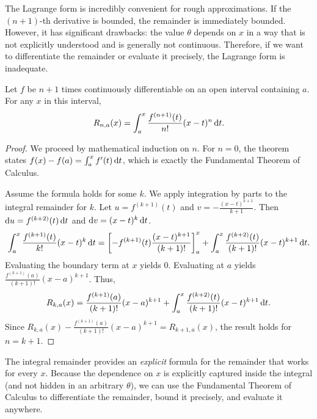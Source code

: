 \documentclass[../analysis1.tex]{subfiles}
\begin{document}
\begin{remark}
    The Lagrange form is incredibly convenient for rough approximations. If the $(n+1)$-th derivative is bounded, the remainder is immediately bounded. However, it has significant drawbacks: the value $\theta$ depends on $x$ in a way that is not explicitly understood and is generally not continuous. Therefore, if we want to differentiate the remainder or evaluate it precisely, the Lagrange form is inadequate.
\end{remark}

\begin{theorem}
\label{thm:tti}
    \begin{shaded*}
        Let $f$ be $n+1$ times continuously differentiable on an open interval containing $a$. For any $x$ in this interval,
        \[
            R_{n,a}(x) = \int_a^x \frac{f^{(n+1)}(t)}{n!} (x-t)^n \d{t}.
        \]
    \end{shaded*}
\end{theorem}

\begin{proof}
    We proceed by mathematical induction on $n$. 
    For $n=0$, the theorem states $f(x) - f(a) = \int_a^x f'(t) \d{t}$, which is exactly the Fundamental Theorem of Calculus.
    
    Assume the formula holds for some $k$. We apply integration by parts to the integral remainder for $k$. Let $u = f^{(k+1)}(t)$ and $v = -\frac{(x-t)^{k+1}}{k+1}$. Then $\d{u} = f^{(k+2)}(t)\d{t}$ and $\d{v} = (x-t)^k\d{t}$.
    \[
        \int_a^x \frac{f^{(k+1)}(t)}{k!} (x-t)^k \d{t} = \left[ -f^{(k+1)}(t) \frac{(x-t)^{k+1}}{(k+1)!} \right]_a^x + \int_a^x \frac{f^{(k+2)}(t)}{(k+1)!} (x-t)^{k+1} \d{t}.
    \]
    Evaluating the boundary term at $x$ yields $0$. Evaluating at $a$ yields $\frac{f^{(k+1)}(a)}{(k+1)!}(x-a)^{k+1}$. Thus,
    \[
        R_{k,a}(x) = \frac{f^{(k+1)}(a)}{(k+1)!}(x-a)^{k+1} + \int_a^x \frac{f^{(k+2)}(t)}{(k+1)!} (x-t)^{k+1} \d{t}.
    \]
    Since $R_{k,a}(x) - \frac{f^{(k+1)}(a)}{(k+1)!}(x-a)^{k+1} = R_{k+1,a}(x)$, the result holds for $n = k+1$.
\end{proof}

\begin{remark}
    The integral remainder provides an \textit{explicit} formula for the remainder that works for every $x$. Because the dependence on $x$ is explicitly captured inside the integral (and not hidden in an arbitrary $\theta$), we can use the Fundamental Theorem of Calculus to differentiate the remainder, bound it precisely, and evaluate it anywhere.
\end{remark}
\end{document}
